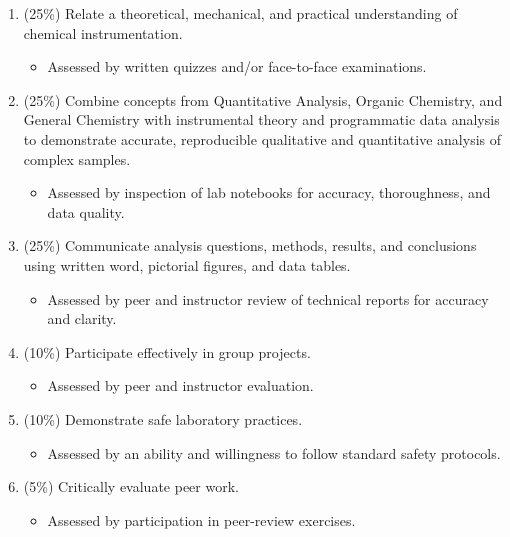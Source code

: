 \documentclass[]{tufte-book}
\providecommand{\tightlist}{%
  \setlength{\itemsep}{0pt}\setlength{\parskip}{0pt}}
\begin{document}
\begin{enumerate}
\def\labelenumi{\arabic{enumi}.}
\tightlist
\item
  (25\%) Relate a theoretical, mechanical, and practical understanding of chemical instrumentation.

  \begin{itemize}
  \tightlist
  \item
    Assessed by written quizzes and/or face-to-face examinations.
  \end{itemize}
\item
  (25\%) Combine concepts from Quantitative Analysis, Organic Chemistry, and General Chemistry with instrumental theory and programmatic data analysis to demonstrate accurate, reproducible qualitative and quantitative analysis of complex samples.

  \begin{itemize}
  \tightlist
  \item
    Assessed by inspection of lab notebooks for accuracy, thoroughness, and data quality.
  \end{itemize}
\item
  (25\%) Communicate analysis questions, methods, results, and conclusions using written word, pictorial figures, and data tables.

  \begin{itemize}
  \tightlist
  \item
    Assessed by peer and instructor review of technical reports for accuracy and clarity.
  \end{itemize}
\item
  (10\%) Participate effectively in group projects.

  \begin{itemize}
  \tightlist
  \item
    Assessed by peer and instructor evaluation.
  \end{itemize}
\item
  (10\%) Demonstrate safe laboratory practices.

  \begin{itemize}
  \tightlist
  \item
    Assessed by an ability and willingness to follow standard safety protocols.
  \end{itemize}
\item
  (5\%) Critically evaluate peer work.

  \begin{itemize}
  \tightlist
  \item
    Assessed by participation in peer-review exercises.
  \end{itemize}
\end{enumerate}
\end{document}
